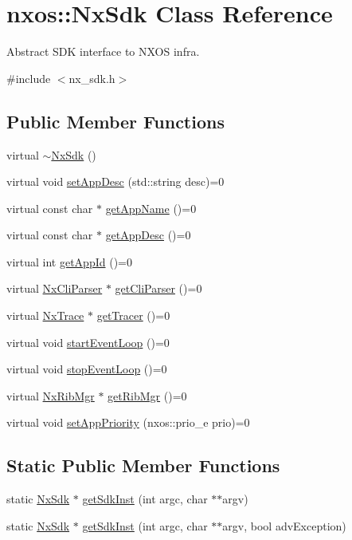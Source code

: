\hypertarget{classnxos_1_1NxSdk}{
\section{nxos::NxSdk Class Reference}
\label{classnxos_1_1NxSdk}
}


Abstract SDK interface to NXOS infra.  


{\ttfamily \#include $<$nx\_\-sdk.h$>$}\subsection*{Public Member Functions}
\begin{DoxyCompactItemize}
\item 
virtual \hyperlink{classnxos_1_1NxSdk_a6b5028045019af4be6c8356ec0fdaff9}{$\sim$NxSdk} ()
\item 
virtual void \hyperlink{classnxos_1_1NxSdk_a2c6007a383114285951b2d2a062dacec}{setAppDesc} (std::string desc)=0
\item 
virtual const char $\ast$ \hyperlink{classnxos_1_1NxSdk_a9ba7da2cd8cb4f82438135ee651efdb0}{getAppName} ()=0
\item 
virtual const char $\ast$ \hyperlink{classnxos_1_1NxSdk_ad6964fa8ee52a8b0a22c27abdcf871e3}{getAppDesc} ()=0
\item 
virtual int \hyperlink{classnxos_1_1NxSdk_ac82af6d262439275f27c745082bf3fd7}{getAppId} ()=0
\item 
virtual \hyperlink{classnxos_1_1NxCliParser}{NxCliParser} $\ast$ \hyperlink{classnxos_1_1NxSdk_a98bcb70d1bf60e38b41eacdf0a72dc89}{getCliParser} ()=0
\item 
virtual \hyperlink{classnxos_1_1NxTrace}{NxTrace} $\ast$ \hyperlink{classnxos_1_1NxSdk_ad2c729bd12d1b9f4bf06f4b70fe28347}{getTracer} ()=0
\item 
virtual void \hyperlink{classnxos_1_1NxSdk_a75ca70643fe325ddf0eea62c1f8c4cc8}{startEventLoop} ()=0
\item 
virtual void \hyperlink{classnxos_1_1NxSdk_adc80e6f244a7cbc050f9dacbc8018315}{stopEventLoop} ()=0
\item 
virtual \hyperlink{classnxos_1_1NxRibMgr}{NxRibMgr} $\ast$ \hyperlink{classnxos_1_1NxSdk_a3cdb42126b1132cf9aa00426a8d5d428}{getRibMgr} ()=0
\item 
virtual void \hyperlink{classnxos_1_1NxSdk_a46d9487216506aa19e5499759f5eaef7}{setAppPriority} (nxos::prio\_\-e prio)=0
\end{DoxyCompactItemize}
\subsection*{Static Public Member Functions}
\begin{DoxyCompactItemize}
\item 
static \hyperlink{classnxos_1_1NxSdk}{NxSdk} $\ast$ \hyperlink{classnxos_1_1NxSdk_a5050e2d26c40744b4fc7862068a83f39}{getSdkInst} (int argc, char $\ast$$\ast$argv)
\item 
static \hyperlink{classnxos_1_1NxSdk}{NxSdk} $\ast$ \hyperlink{classnxos_1_1NxSdk_acdeb12edbd291b5421ddb3260547bf8a}{getSdkInst} (int argc, char $\ast$$\ast$argv, bool advException)
\end{DoxyCompactItemize}


